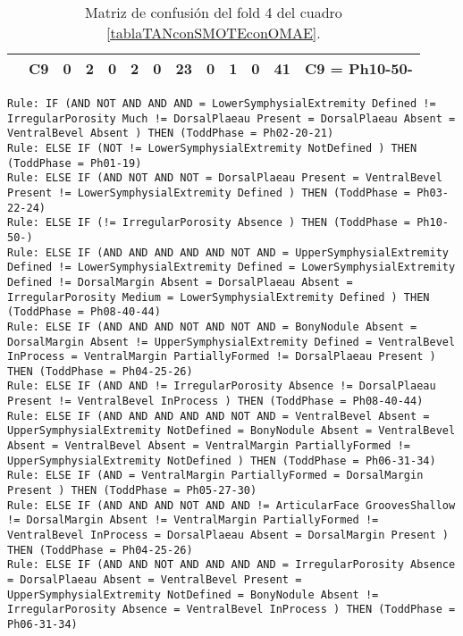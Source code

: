 \begin{table}[H]
{\begin{tabular}{|ccrrrrrrrrrrc|}
\multicolumn{1}{|c|}{}                                      & \multicolumn{1}{c|}{C9} & \multicolumn{1}{c|}{0}  & \multicolumn{1}{c|}{\textbf{2}}  & \multicolumn{1}{c|}{0}  & \multicolumn{1}{c|}{\textbf{2}}  & \multicolumn{1}{c|}{0}  & \multicolumn{1}{c|}{\textbf{23}} & \multicolumn{1}{c|}{0}  & \multicolumn{1}{c|}{\textbf{1}}  & \multicolumn{1}{c|}{0}  & \multicolumn{1}{c|}{\textbf{41}} & C9 = Ph10-50-     \\ \hline
\end{tabular}%
}
\caption{Matriz de confusión del fold 4 del cuadro \ref{tablaTANconSMOTEconOMAE}.}
\end{table}

\begin{lstlisting}
Rule: IF (AND NOT AND AND AND = LowerSymphysialExtremity Defined != IrregularPorosity Much != DorsalPlaeau Present = DorsalPlaeau Absent = VentralBevel Absent ) THEN (ToddPhase = Ph02-20-21)
Rule: ELSE IF (NOT != LowerSymphysialExtremity NotDefined ) THEN (ToddPhase = Ph01-19)
Rule: ELSE IF (AND NOT AND NOT = DorsalPlaeau Present = VentralBevel Present != LowerSymphysialExtremity Defined ) THEN (ToddPhase = Ph03-22-24)
Rule: ELSE IF (!= IrregularPorosity Absence ) THEN (ToddPhase = Ph10-50-)
Rule: ELSE IF (AND AND AND AND AND NOT AND = UpperSymphysialExtremity Defined != LowerSymphysialExtremity Defined = LowerSymphysialExtremity Defined != DorsalMargin Absent = DorsalPlaeau Absent = IrregularPorosity Medium = LowerSymphysialExtremity Defined ) THEN (ToddPhase = Ph08-40-44)
Rule: ELSE IF (AND AND AND NOT AND NOT AND = BonyNodule Absent = DorsalMargin Absent != UpperSymphysialExtremity Defined = VentralBevel InProcess = VentralMargin PartiallyFormed != DorsalPlaeau Present ) THEN (ToddPhase = Ph04-25-26)
Rule: ELSE IF (AND AND != IrregularPorosity Absence != DorsalPlaeau Present != VentralBevel InProcess ) THEN (ToddPhase = Ph08-40-44)
Rule: ELSE IF (AND AND AND AND AND NOT AND = VentralBevel Absent = UpperSymphysialExtremity NotDefined = BonyNodule Absent = VentralBevel Absent = VentralBevel Absent = VentralMargin PartiallyFormed != UpperSymphysialExtremity NotDefined ) THEN (ToddPhase = Ph06-31-34)
Rule: ELSE IF (AND = VentralMargin PartiallyFormed = DorsalMargin Present ) THEN (ToddPhase = Ph05-27-30)
Rule: ELSE IF (AND AND AND NOT AND AND != ArticularFace GroovesShallow != DorsalMargin Absent != VentralMargin PartiallyFormed != VentralBevel InProcess = DorsalPlaeau Absent = DorsalMargin Present ) THEN (ToddPhase = Ph04-25-26)
Rule: ELSE IF (AND AND NOT AND AND AND AND = IrregularPorosity Absence = DorsalPlaeau Absent = VentralBevel Present = UpperSymphysialExtremity NotDefined = BonyNodule Absent != IrregularPorosity Absence = VentralBevel InProcess ) THEN (ToddPhase = Ph06-31-34)

\end{lstlisting}
